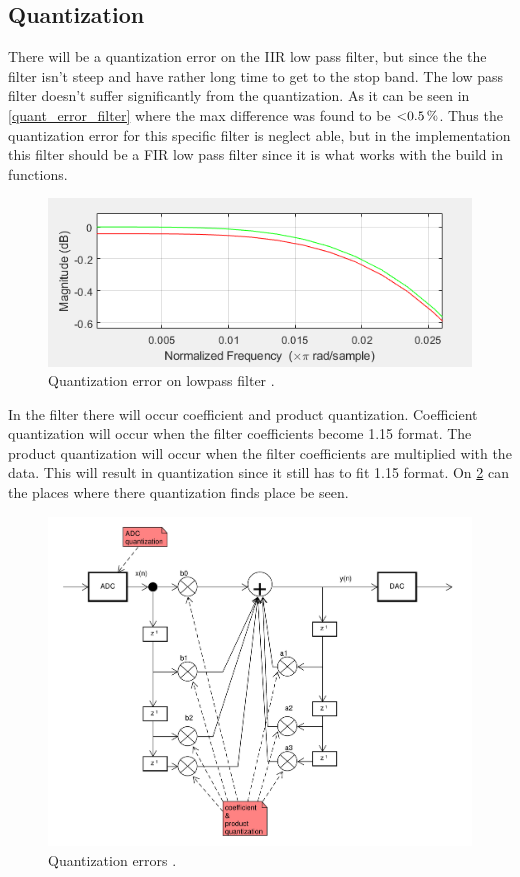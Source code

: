 \subsection{Quantization} 
There will be a quantization error on the IIR low pass filter, but since the the filter isn't steep and have rather long time to get to the stop band. 
The low pass filter doesn't suffer significantly from the quantization.  
As it can be seen in \cref{quant_error_filter} where the max difference was found to be $\SI{<0.5}{\%} $.
Thus the quantization error for this specific filter is neglect able, but in the implementation this filter should be a FIR low pass filter since it is what works with the build in functions.
\begin{figure}
	\centering
	\includegraphics[width=1\linewidth]{gfx/QuantizationFilter.png}
	\caption{Quantization error on lowpass filter \systemName.}
	\label{fig:quant_error_filter}
\end{figure}
In the filter there will occur coefficient and product quantization. Coefficient quantization will occur when the filter coefficients become 1.15 format. The product quantization will occur when the filter coefficients are multiplied with the data. This will result in quantization since it still has to fit 1.15 format. On \cref{fig:quant_error} can the places where there quantization finds place be seen. 
\begin{figure}
	\centering
	\includegraphics[width=1\linewidth]{gfx/Design/flow_quant_error.pdf}
	\caption{Quantization errors \systemName.}
	\label{fig:quant_error}
\end{figure}


\FloatBarrier